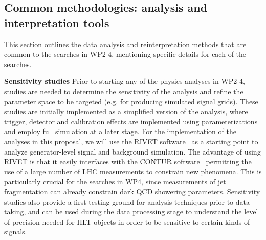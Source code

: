 
\subsection{Common methodologies: analysis and interpretation tools}
\label{sub:CommonMethodsAnalysisTools}

This section outlines the data analysis and reinterpretation methods that are common to the searches in WP2-4, mentioning specific details for each of the searches. 

\textbf{Sensitivity studies} Prior to starting any of the physics analyses in WP2-4, studies are needed to determine the sensitivity of the analysis and refine the parameter space to be targeted (e.g. for producing simulated signal grids). 
These studies are initially implemented as a simplified version of the analysis, where trigger, detector and calibration effects are implemented using parameterizations and employ full simulation at a later stage. 
For the implementation of the analyses in this proposal, we will use the RIVET software~\cite{ToBeCited}%
as a starting point to analyze generator-level signal and background simulation. 
The advantage of using RIVET is that it easily interfaces with the CONTUR software~\cite{ToBeCited}%
permitting the use of a large number of LHC measurements to constrain new phenomena. 
This is particularly crucial for the searches in WP4, since measurements of jet fragmentation can already constrain dark QCD showering parameters. 
Sensitivity studies also provide a first testing ground for analysis techniques prior to data taking, and can be used during the data processing stage 
to understand the level of precision needed for HLT objects in order to be sensitive to certain kinds of signals. 

